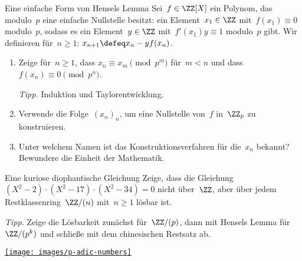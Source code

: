 \documentclass{uebblatt}
\begin{document}
\begin{aufgabe}{Eine einfache Form von Hensels Lemma}
Sei~$f \in \ZZ[X]$ ein
Polynom, das modulo~$p$ eine einfache Nullstelle besitzt: ein Element~$x_1
\in \ZZ$ mit~$f(x_1) \equiv 0$ modulo~$p$, sodass es ein Element~$y \in \ZZ$
mit~$f'(x_1) y \equiv 1$ modulo~$p$ gibt.
Wir definieren für~$n \geq 1$: $x_{n+1} \defeq x_n - y f(x_n)$.
\begin{enumerate}
\item Zeige für~$n \geq 1$, dass $x_n \equiv x_m \pmod{p^m}$ für~$m < n$ und dass~$f(x_n) \equiv 0 \pmod{p^n}$.

{\tiny\emph{Tipp.} Induktion und Taylorentwicklung.\par}
\item Verwende die Folge~$(x_n)_n$, um eine Nullstelle von~$f$ in~$\ZZ_p$ zu
konstruieren.
\item Unter welchem Namen ist das Konstruktionsverfahren für die~$x_n$ bekannt?
Bewundere die Einheit der Mathematik.
\end{enumerate}
\end{aufgabe}

\begin{aufgabe*}{Eine kuriose diophantische Gleichung}
Zeige, dass die Gleichung~$(X^2 - 2) \cdot (X^2 - 17) \cdot (X^2 - 34) = 0$
nicht über~$\ZZ$, aber über jedem Restklassenring~$\ZZ/(n)$ mit~$n \geq 1$
lösbar ist.

{\tiny\emph{Tipp.} Zeige die Lösbarkeit zunächst für~$\ZZ/(p)$, dann mit
Hensels Lemma für~$\ZZ/(p^k)$ und schließe mit dem chinesischen Restsatz
ab.\par}
\end{aufgabe*}

{\centering\href{https://en.wikipedia.org/wiki/P-adic_number}{\texttt{[image: images/p-adic-numbers]}}\par}
\end{document}
